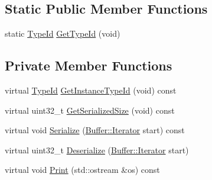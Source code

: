 \subsection*{Static Public Member Functions}
\begin{DoxyCompactItemize}
\item 
static \hyperlink{classns3_1_1TypeId}{Type\+Id} \hyperlink{classns3_1_1Icmpv4DestinationUnreachable_a299f4f0f809736375a7853a1abfe50c9}{Get\+Type\+Id} (void)
\end{DoxyCompactItemize}
\subsection*{Private Member Functions}
\begin{DoxyCompactItemize}
\item 
virtual \hyperlink{classns3_1_1TypeId}{Type\+Id} \hyperlink{classns3_1_1Icmpv4DestinationUnreachable_af7529cd7d02e8e81237dd41420859c1f}{Get\+Instance\+Type\+Id} (void) const 
\item 
virtual uint32\+\_\+t \hyperlink{classns3_1_1Icmpv4DestinationUnreachable_a6f84f900bc7bf2f25109dd75374a0ec4}{Get\+Serialized\+Size} (void) const 
\item 
virtual void \hyperlink{classns3_1_1Icmpv4DestinationUnreachable_a38e6b156675363e4af25597181b4d6c7}{Serialize} (\hyperlink{classns3_1_1Buffer_1_1Iterator}{Buffer\+::\+Iterator} start) const 
\item 
virtual uint32\+\_\+t \hyperlink{classns3_1_1Icmpv4DestinationUnreachable_ab27e34a3e2436724ebb483d8acd58ea7}{Deserialize} (\hyperlink{classns3_1_1Buffer_1_1Iterator}{Buffer\+::\+Iterator} start)
\item 
virtual void \hyperlink{classns3_1_1Icmpv4DestinationUnreachable_ae5a10aa0c58e4a8db0155480b5cbd6a3}{Print} (std\+::ostream \&os) const 
\end{DoxyCompactItemize}
